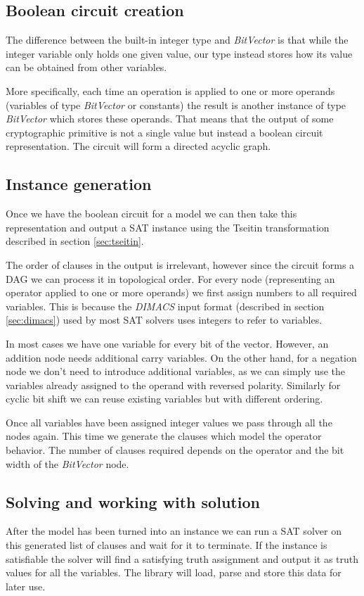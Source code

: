 \subsection{Boolean circuit creation}
The difference between the built-in integer type and \emph{BitVector} is that while the integer variable only holds one given value, our type instead stores how its value can be obtained from other variables.

More specifically, each time an operation is applied to one or more operands (variables of type \emph{BitVector} or constants) the result is another instance of type \emph{BitVector} which stores these operands.  That means that the output of some cryptographic primitive is not a single value but instead a boolean circuit representation. The circuit will form a directed acyclic graph.

\subsection{Instance generation}
Once we have the boolean circuit for a model we can then take this representation and output a SAT instance using the Tseitin transformation described in section \ref{sec:tseitin}.

The order of clauses in the output is irrelevant, however since the circuit forms a DAG we can process it in topological order.
For every node (representing an operator applied to one or more operands) we first assign numbers to all required variables.
This is because the \emph{DIMACS} input format (described in section \ref{sec:dimacs}) used by most SAT solvers uses integers to refer to variables.

In most cases we have one variable for every bit of the vector.
However, an addition node needs additional carry variables.
On the other hand, for a negation node we don't need to introduce additional variables, as we can simply use the variables already assigned to the operand with reversed polarity.
Similarly for cyclic bit shift we can reuse existing variables but with different ordering.

Once all variables have been assigned integer values we pass through all the nodes again.
This time we generate the clauses which model the operator behavior.
The number of clauses required depends on the operator and the bit width of the \emph{BitVector} node.

\subsection{Solving and working with solution}
After the model has been turned into an instance we can run a SAT solver on this generated list of clauses and wait for it to terminate.
If the instance is satisfiable the solver will find a satisfying truth assignment and output it as truth values for all the variables.
The library will load, parse and store this data for later use.

